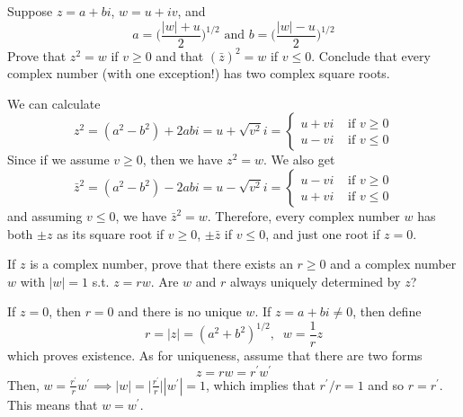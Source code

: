   \begin{exercise}[Rudin 1.10]
    Suppose $z = a + bi$, $w = u + iv$, and 
    \begin{equation}
      a = \bigg( \frac{|w| + u}{2} \bigg)^{1/2} \text{ and } b = \bigg( \frac{|w| - u}{2} \bigg)^{1/2}
    \end{equation}
    Prove that $z^2 = w$ if $v \geq 0$ and that $(\bar{z})^2 = w$ if $v \leq 0$. Conclude that every complex number (with one exception!) has two complex square roots. 
  \end{exercise}
  \begin{solution}
    We can calculate 
    \begin{equation}
      z^2 = (a^2 - b^2) + 2 a b i = u + \sqrt{v^2} i = \begin{cases} u + v i & \text{ if } v \geq 0 \\ u - vi & \text{ if } v \leq 0 \end{cases} 
    \end{equation}
    Since if we assume $v \geq 0$, then we have $z^2 = w$. We also get 
    \begin{equation}
      \bar{z}^2 = (a^2 - b^2) - 2 a b i = u - \sqrt{v^2} i = \begin{cases} u - v i & \text{ if } v \geq 0 \\ u + vi & \text{ if } v \leq 0 \end{cases}
    \end{equation}
    and assuming $v \leq 0$, we have $\bar{z}^2 = w$. Therefore, every complex number $w$ has both $\pm z$ as its square root if $v \geq 0$, $\pm \bar{z}$ if $v \leq 0$, and just one root if $z = 0$. 
  \end{solution}

  \begin{exercise}[Rudin 1.11]
    If $z$ is a complex number, prove that there exists an $r \geq 0$ and a complex number $w$ with $|w| = 1$ s.t. $z = rw$. Are $w$ and $r$ always uniquely determined by $z$? 
  \end{exercise}
  \begin{solution}
    If $z = 0$, then $r = 0$ and there is no unique $w$. If $z = a + bi \neq 0$, then define 
    \begin{equation}
      r = |z| = (a^2 + b^2)^{1/2}, \;\; w = \frac{1}{r} z
    \end{equation}
    which proves existence. As for uniqueness, assume that there are two forms 
    \begin{equation}
      z = r w = r^\prime w^\prime
    \end{equation}
    Then, $w = \frac{r^\prime}{r} w^\prime \implies |w| = \big| \frac{r^\prime}{r} \big| |w^\prime| = 1$, which implies that $r^\prime / r = 1$ and so $r = r^\prime$. This means that $w = w^\prime$. 
  \end{solution}

